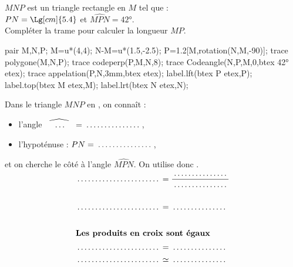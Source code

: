 \begin{exercice*}
    $MNP$ est un triangle rectangle en $M$ tel que :\\$PN=\Lg[cm]{5.4}$ et $\widehat{MPN}=\ang{42}$.\\
    Compléter la trame pour calculer la longueur $MP$.
    \begin{center}
        \begin{Geometrie}[CoinHD={(6u,4.5u)}]        
            pair M,N,P;
            M=u*(4,4);
            N-M=u*(1.5,-2.5);
            P=1.2[M,rotation(N,M,-90)];
            trace polygone(M,N,P);            
            trace codeperp(P,M,N,8);
            trace Codeangle(N,P,M,0,btex \ang{42} etex);
            trace appelation(P,N,3mm,btex  etex);
            label.lft(btex P etex,P);
            label.top(btex M etex,M);
            label.lrt(btex N etex,N);
        \end{Geometrie}
    \end{center}
    Dans le triangle $MNP$ \makebox[0.2\linewidth]{\dotfill} en \makebox[0.1\linewidth]{\dotfill}, on connaît :
    \begin{itemize}        
        \item l'angle $\widehat{\phantom{M}\dots\phantom{N}}=\makebox[0.2\linewidth]{\dotfill}$,
        \item l'hypoténuse : $PN=\makebox[0.2\linewidth]{\dotfill}$,
    \end{itemize}
    et on cherche le côté \makebox[0.3\linewidth]{\dotfill} à l'angle $\widehat{MPN}$. On utilise donc \makebox[0.2\linewidth]{\dotfill}.
    \begin{align*}
        \makebox[0.3\linewidth]{\dotfill}&=\frac{\makebox[0.2\linewidth]{\dotfill}}{\makebox[0.2\linewidth]{\dotfill}}\\
        &\\
        \makebox[0.3\linewidth]{\dotfill}&=\makebox[0.2\linewidth]{\dotfill}\\
        &\\
        \intertext{\centering\bf Les produits en croix sont égaux}
        \makebox[0.3\linewidth]{\dotfill}&=\makebox[0.2\linewidth]{\dotfill}\\        
        \makebox[0.3\linewidth]{\dotfill}&\simeq\makebox[0.2\linewidth]{\dotfill}
    \end{align*}
\end{exercice*}

